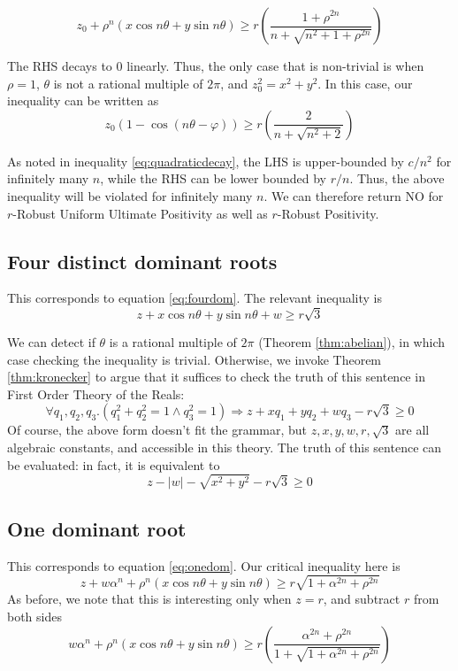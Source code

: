 \begin{equation}
z_0 + \rho^n (x \cos n\theta + y \sin n \theta) \ge r\left( \frac{1 + \rho^{2n}}{n+ \sqrt{n^2 + 1 + \rho^{2n}}}\right)
\end{equation}

The RHS decays to $0$ linearly. Thus, the only case that is non-trivial is when $\rho = 1$, $\theta$ is not a rational multiple of $2\pi$, and $z_0^2 = x^2 + y^2$. In this case, our inequality can be written as
\begin{equation}
z_0(1 - \cos(n\theta - \varphi)) \ge r\left( \frac{2}{n+ \sqrt{n^2 + 2}}\right)
\end{equation}

As noted in inequality \ref{eq:quadraticdecay}, the LHS is upper-bounded by $c/n^2$ for infinitely many $n$, while the RHS can be lower bounded by $r/n$. Thus, the above inequality will be violated for infinitely many $n$. We can therefore return NO for $r$-Robust Uniform Ultimate Positivity as well as $r$-Robust Positivity.

\subsection{Four distinct dominant roots}
This corresponds to equation \ref{eq:fourdom}. The relevant inequality is
\begin{equation}
z + x \cos n\theta + y\sin n\theta + w \ge r\sqrt{3}
\end{equation}

We can detect if $\theta$ is a rational multiple of $2\pi$ (Theorem \ref{thm:abelian}), in which case checking the inequality is trivial. Otherwise, we invoke Theorem \ref{thm:kronecker} to argue that it suffices to check the truth of this sentence in First Order Theory of the Reals:
\begin{equation}
\forall q_1, q_2, q_3. \left(q_1^2 + q_2^2 = 1 \land q_3^2 = 1\right) \Rightarrow z + xq_1 + yq_2 + wq_3 - r\sqrt{3} \ge 0
\end{equation}
Of course, the above form doesn't fit the grammar, but $z, x, y, w, r, \sqrt{3}$ are all algebraic constants, and accessible in this theory. The truth of this sentence can be evaluated: in fact, it is equivalent to
\begin{equation}
\label{eq:cone}
z - |w| - \sqrt{x^2 + y^2} - r\sqrt{3} \ge 0
\end{equation}

\subsection{One dominant root}
This corresponds to equation \ref{eq:onedom}. Our critical inequality here is
\begin{equation}
z + w\alpha^n + \rho^n(x \cos n\theta + y \sin n \theta) \ge r\sqrt{1 + \alpha^{2n} + \rho^{2n}}
\end{equation}
As before, we note that this is interesting only when $z = r$, and subtract $r$ from both sides
\begin{equation}
w\alpha^n + \rho^n(x \cos n\theta + y \sin n \theta) \ge r\left(\frac{\alpha^{2n} + \rho^{2n}}{1 + \sqrt{1 + \alpha^{2n} + \rho^{2n}}}\right)
\end{equation}

